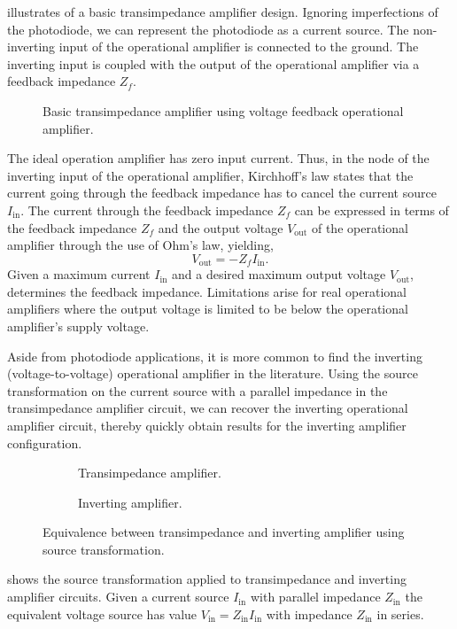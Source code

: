 illustrates of a basic transimpedance amplifier design.
Ignoring imperfections of the photodiode, we can represent the photodiode as a current source.
The non-inverting input of the operational amplifier is connected to the ground.
The inverting input is coupled with the output of the operational amplifier via a feedback impedance $Z_f$.
\begin{figure}[H]
	\centering
	
	\caption{Basic transimpedance amplifier using voltage feedback operational amplifier.}\label{fig:basic_transimpedance}
\end{figure}
The ideal operation amplifier has zero input current. Thus, in the node of the inverting input of the operational amplifier, Kirchhoff's law states that the current going through the feedback impedance has to cancel the current source $I_\text{in}$.
The current through the feedback impedance $Z_f$ can be expressed in terms of the feedback impedance $Z_f$ and the output voltage $V_\text{out}$ of the operational amplifier through the use of Ohm's law, yielding,
\begin{equation}
	V_\text{out}=-Z_fI_\text{in}
	\label{eq:transimpedance}.
\end{equation}
Given a maximum current $I_\text{in}$ and a desired maximum output voltage $V_\text{out}$,  determines the feedback impedance.
Limitations arise for real operational amplifiers where the output voltage is limited to be below the operational amplifier's supply voltage.


Aside from photodiode applications, it is more common to find the inverting (voltage-to-voltage) operational amplifier in the literature.
Using the source transformation on the current source with a parallel impedance in the transimpedance amplifier circuit, we can recover the inverting operational amplifier circuit, thereby quickly obtain results for the inverting amplifier configuration.
\begin{figure}[H]
	\begin{subfigure}[t]{.5\textwidth}
		\centering
		
		\caption{Transimpedance amplifier.}
	\end{subfigure}
	\begin{subfigure}[t]{.5\textwidth}
		\centering
		
		\caption{Inverting amplifier.}
	\end{subfigure}
	\caption{Equivalence between transimpedance and inverting amplifier using source transformation.}\label{fig:equivalence_transimpedance_inverting}
\end{figure}
 shows the source transformation applied to transimpedance and inverting amplifier circuits.
Given a current source $I_\text{in}$ with parallel impedance $Z_\text{in}$ the equivalent voltage source has value $V_\text{in}=Z_\text{in}I_\text{in}$ with impedance $Z_\text{in}$ in series.

